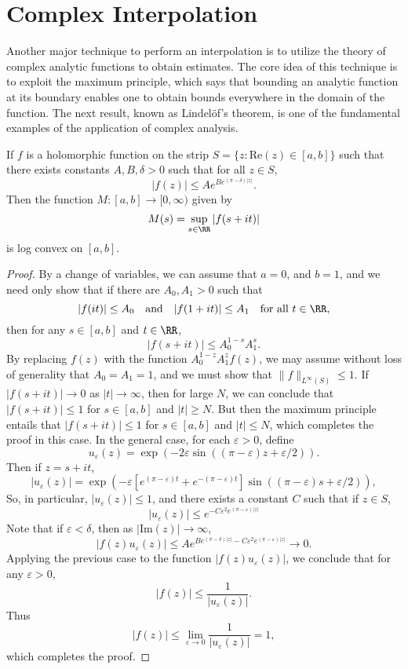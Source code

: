 \section{Complex Interpolation}

Another major technique to perform an interpolation is to utilize the theory of complex analytic functions to obtain estimates. The core idea of this technique is to exploit the maximum principle, which says that bounding an analytic function at its boundary enables one to obtain bounds everywhere in the domain of the function. The next result, known as Lindel\"{o}f's theorem, is one of the fundamental examples of the application of complex analysis.

\begin{theorem}
    If $f$ is a holomorphic function on the strip $S = \{ z : \text{Re}(z) \in [a,b] \}$ such that there exists constants $A,B,\delta > 0$ such that for all $z \in S$,
    \[ |f(z)| \leq Ae^{Be^{(\pi - \delta)|z|}}. \]
    Then the function $M: [a,b] \to [0,\infty)$ given by
    \[ M(s) = \sup_{s \in \RR} |f(s + it)| \]
    is log convex on $[a,b]$.
\end{theorem}
\begin{proof}
    By a change of variables, we can assume that $a = 0$, and $b = 1$, and we need only show that if there are $A_0, A_1 > 0$ such that
    \[ |f(it)| \leq A_0 \quad\text{and}\quad |f(1 + it)| \leq A_1 \quad \text{for all $t \in \RR$}, \]
    then for any $s \in [a,b]$ and $t \in \RR$,
    \[ |f(s + it)| \leq A_0^{1 - s} A_1^s. \]
    By replacing $f(z)$ with the function $A_0^{1-z} A_1^z f(z)$, we may assume without loss of generality that $A_0 = A_1 = 1$, and we must show that $\| f \|_{L^\infty(S)} \leq 1$. If $|f(s + it)| \to 0$ as $|t| \to \infty$, then for large $N$, we can conclude that $|f(s + it)| \leq 1$ for $s \in [a,b]$ and $|t| \geq N$. But then the maximum principle entails that $|f(s + it)| \leq 1$ for $s \in [a,b]$ and $|t| \leq N$, which completes the proof in this case. In the general case, for each $\varepsilon > 0$, define
    \[ u_\varepsilon(z) = \exp(- 2 \varepsilon \sin((\pi - \varepsilon) z + \varepsilon/2)). \]
    Then if $z = s + it$,
    \[ |u_\varepsilon(z)| = \exp(- \varepsilon [e^{(\pi - \varepsilon) t} + e^{-(\pi - \varepsilon) t}] \sin((\pi - \varepsilon) s + \varepsilon/2)), \]
    So, in particular, $|u_\varepsilon(z)| \leq 1$, and there exists a constant $C$ such that if $z \in S$,
    \[ |u_\varepsilon(z)| \leq e^{- C \varepsilon^2 e^{(\pi - \varepsilon) |z|}} \]
    Note that if $\varepsilon < \delta$, then as $|\text{Im}(z)| \to \infty$,
    \[ |f(z) u_\varepsilon(z)| \leq A e^{B e^{(\pi - \delta) |z|} - C \varepsilon^2 e^{(\pi - \varepsilon) |z|} } \to 0. \]
    Applying the previous case to the function $|f(z) u_\varepsilon(z)|$, we conclude that for any $\varepsilon > 0$,
    \[ |f(z)| \leq \frac{1}{|u_\varepsilon(z)|}. \]
    Thus
    \[ |f(z)| \leq \lim_{\varepsilon \to 0} \frac{1}{|u_\varepsilon(z)|} = 1, \]
    which completes the proof.
\end{proof}

